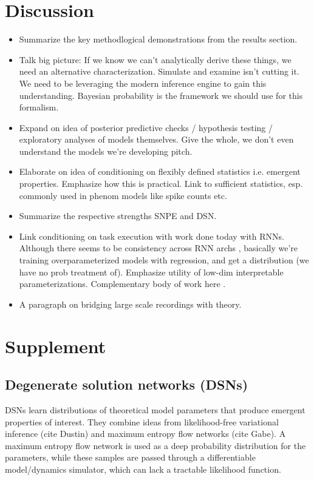 \documentclass[11pt]{article}
\begin{document}
\section{Discussion}
\begin{itemize}
\item Summarize the key methodlogical demonstrations from the results section.
\item Talk big picture: If we know we can't analytically derive these things, we need an alternative characterization.  Simulate and examine isn't cutting it.  We need to be leveraging the modern inference engine to gain this understanding.  Bayesian probability is the framework we should use for this formalism.
\item Expand on idea of posterior predictive checks / hypothesis testing / exploratory analyses of models themselves.  Give the whole, we don't even understand the models we're developing pitch.
\item Elaborate on idea of conditioning on flexibly defined statistics i.e. emergent properties. Emphasize how this is practical.  Link to sufficient statistics, esp. commonly used in phenom models like spike counts etc.
\item Summarize the respective strengths SNPE and DSN.
\item Link conditioning on task execution with work done today with RNNs.  Although there seems to be consistency across RNN archs \cite{universality2019Maheswaranathan}, basically we're training overparameterized models with regression, and get a distribution (we have no prob treatment of). Emphasize utility of low-dim interpretable parameterizations. Complementary body of work here \cite{zhao2016interpretable, duncker2019learning}.
\item A paragraph on bridging large scale recordings with theory.
\end{itemize}





\appendix

\section{Supplement}

\subsection{Degenerate solution networks (DSNs)}
DSNs learn distributions of theoretical model parameters that produce emergent properties of interest.  They combine ideas from likelihood-free variational inference (cite Dustin) and maximum entropy flow networks (cite Gabe).  A maximum entropy flow network is used as a deep probability distribution for the parameters, while these samples are passed through a differentiable model/dynamics simulator, which can lack a tractable likelihood function.
\end{document}

